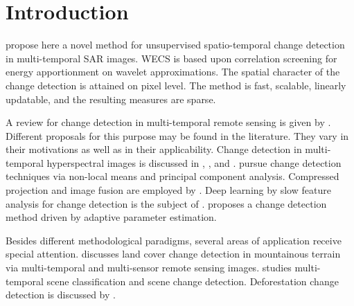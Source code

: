 \documentclass[journal]{IEEEtran}
\begin{document}
%
\IEEEpeerreviewmaketitle



\section{Introduction}
% 
% 
% 
% 
 propose here a novel method for unsupervised spatio-temporal change detection in multi-temporal SAR images. WECS is based upon correlation screening for energy apportionment on wavelet approximations. The spatial character of the change detection is attained on pixel level. The method is fast, scalable, linearly updatable, and the resulting measures are sparse. 

A review for change detection in multi-temporal remote sensing is given by \cite{ban2016change}. 
Different proposals for this purpose may be found  in the literature. They vary in their motivations as well as in their applicability.  Change detection in multi-temporal hyperspectral images is discussed in \cite{bovolo2015time},  \cite{liu2019review}, and \cite{matsunaga2017current}.  \cite{jia2018novel} pursue change detection techniques via non-local means and principal component analysis. Compressed projection and image fusion are employed by \cite{hou2014unsupervised}. Deep learning by slow feature analysis for change detection is the subject of \cite{du2019unsupervised}. \cite{chen2020change} proposes a change detection method driven by adaptive parameter estimation.

Besides different methodological paradigms, several areas of application receive special attention.  \cite{song2018multi} discusses land cover change detection in mountainous terrain via multi-temporal and multi-sensor remote sensing images. \cite{ru2021multi} studies multi-temporal scene classification and scene change detection. Deforestation change detection is discussed by \cite{barreto2016deforestation}. 
\end{document}
